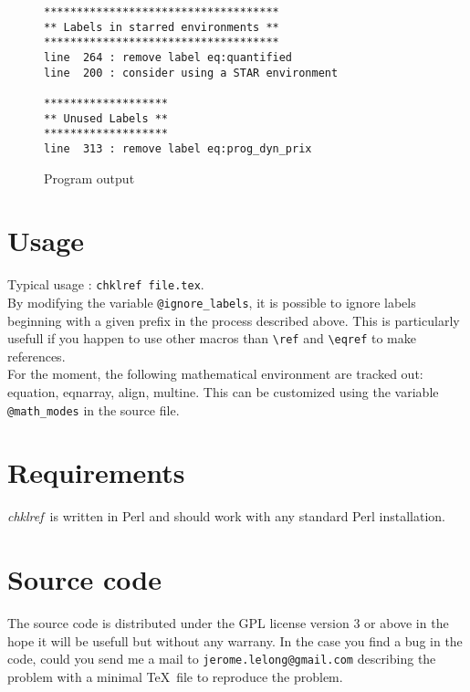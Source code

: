 \documentclass[a4paper,11pt,twoside]{article}
\def\chk{{\it chklref}}
\begin{document}
\begin{figure}[htbp]
  \centering
\begin{verbatim}
************************************
** Labels in starred environments **
************************************
line  264 : remove label eq:quantified
line  200 : consider using a STAR environment

*******************
** Unused Labels **
*******************
line  313 : remove label eq:prog_dyn_prix
\end{verbatim}
  \caption{Program output}
  \label{fig:output}
\end{figure}


\section{Usage}

Typical usage : \verb!chklref file.tex!.
\\

\noindent By modifying the variable \verb!@ignore_labels!, it is possible to ignore labels
beginning with a given prefix in the process described above. This is
particularly usefull if you happen to use other macros than \verb!\ref! and
\verb!\eqref! to make references.
\\

\noindent For the moment, the following mathematical environment are tracked out:
equation, eqnarray, align, multine. This can be customized using the variable
\verb!@math_modes! in the source file.

\section{Requirements}

\chk\ is written in Perl and should work with any standard Perl
installation.


\section{Source code}

The source code is distributed under the GPL license version 3 or above in the
hope it will be usefull but without any warrany. In the case you find a bug in
the code, could you send me a mail to \verb!jerome.lelong@gmail.com! describing
the problem with a minimal \TeX\ file to reproduce the problem.
\end{document}

